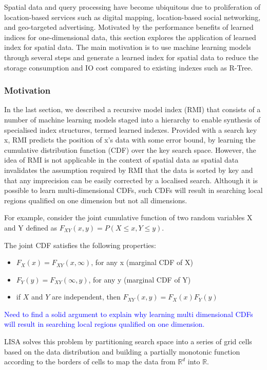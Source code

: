 Spatial data and query processing have become ubiquitous due to proliferation of location-based services such as digital mapping, location-based social networking,
and geo-targeted advertising. Motivated by the performance benefits of learned indices
for one-dimensional data, this section explores the application of learned index for spatial data. The main motivation is to use machine learning models through several steps and generate a learned index for spatial data to reduce the storage consumption and IO cost compared to existing indexes such as R-Tree.

\subsubsection{Motivation}
In the last section, we described a recursive model index (RMI) that consists of a
number of machine learning models staged into a hierarchy to enable synthesis of specialised index structures, termed learned indexes. Provided with a search key x, RMI predicts the position of x's data with some error bound, by learning the cumulative distribution function (CDF) over the key search space. However, the idea of RMI is not applicable in the context of spatial data as spatial data invalidates the assumption required by RMI that the data is sorted by key and that any imprecision can be easily corrected by a localised search. Although it is possible to learn multi-dimensional CDFs, such CDFs will result in searching local regions qualified on one dimension but not all dimensions.

For example, consider the joint cumulative function of two random variables X and Y defined as $F_{XY}(x, y)=P(X\leq x, Y\leq y)$.

The joint CDF satisfies the following properties:

\begin{itemize}
  \item  {$F_X(x)=F_{XY}(x,\infty)$, for any x (marginal CDF of X)}
  \item  {$F_Y(y)=F_{XY}(\infty,y)$, for any y (marginal CDF of Y)}
  \item  {if $X$ and $Y$ are independent, then $F_{XY}(x,y)=F_X(x)F_Y(y)$}
\end{itemize}

\textcolor{blue} {Need to find a solid argument to explain why learning multi dimensional CDFs will result in  searching local regions qualified on one dimension. }

LISA solves this problem by partitioning search space into a series of grid cells based on the data distribution and building a partially monotonic function according to the borders of cells to map the data from $\mathbb{R}^d$ into $\mathbb{R}$.

